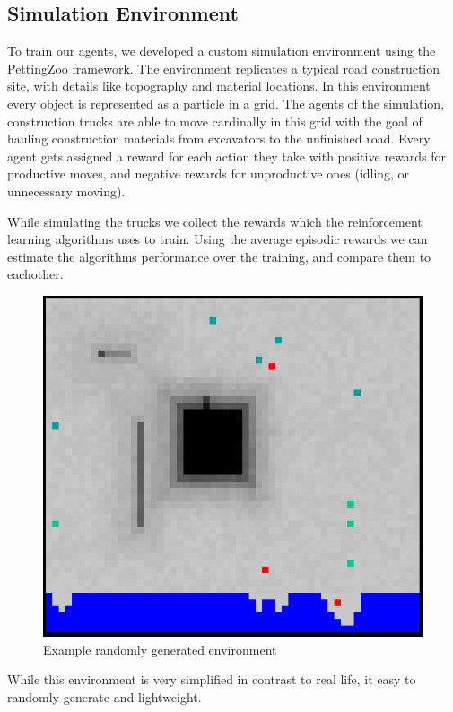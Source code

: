\documentclass[conference]{IEEEtran}
\begin{document}
\subsection{Simulation Environment}
To train our agents, we developed a custom simulation environment using the PettingZoo framework. The environment replicates a typical road construction site, with details like topography and material locations. In this environment every object is represented as a particle in a grid.
The agents of the simulation, construction trucks are able to move cardinally in this grid with the goal of hauling construction materials from excavators to the unfinished road.
Every agent gets assigned a reward for each action they take with positive rewards for productive moves, and negative rewards for unproductive ones (idling, or unnecessary moving).

While simulating the trucks we collect the rewards which the reinforcement learning algorithms uses to train.
Using the average episodic rewards we can estimate the algorithms performance over the training, and compare them to eachother.
\begin{figure}[h!]
	\includegraphics[width=0.9\columnwidth]{graphs/example_env.png}
	\caption{Example randomly generated environment}
\end{figure}
While this environment is very simplified in contrast to real life, it easy to randomly generate and lightweight.
\end{document}
